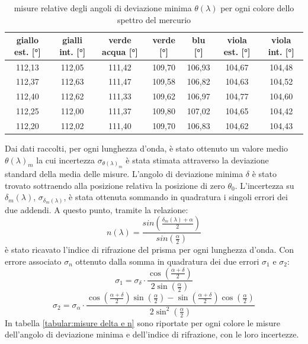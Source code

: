 \documentclass{article}
\begin{document}
        \begin{table}[H]

            \centering
            \begin{tabular}{c c c c c c c}

                \toprule 
                giallo est. [°] & gialli int. [°]& verde acqua [°]& verde [°]& blu [°]& viola est. [°]& viola int. [°]  \\
                
                \midrule
                112,13	&	112,05	&	111,42	&	109,70	&	106,93	&	104,67	&	104,48\\
                112,37	&	112,63	&	111,47	&	109,58	&	106,82	&	104,63	&	104,52\\
                112,40	&	112,62	&	111,33	&	109,62	&	106,97	&	104,77	&	104,60\\
                112,25	&	112,00	&	111,37	&	109,80	&	107,02	&	104,65	&	104,42\\
                112,20	&	112,02	&	111,40	&	109,70	&	106,83	&	104,62	&	104,43\\
                \bottomrule

            \end{tabular}

            \caption{misure relative degli angoli di deviazione minima $\theta(\lambda)$ per ogni colore dello spettro del mercurio}
            \label{tabular:theta misure}

        \end{table}

        Dai dati raccolti, per ogni lunghezza d'onda, è stato ottenuto un valore medio $\theta(\lambda)_m$ la cui incertezza $\sigma_{\theta(\lambda)_m}$ 
        è stata stimata attraverso la deviazione standard della media delle misure. L'angolo di deviazione minima $\delta$ è stato trovato sottraendo 
        alla posizione relativa la posizione di zero $\theta_0$. L'incertezza su $\delta_m(\lambda)$, $\sigma_{\delta_m(\lambda)}$, è stata ottenuta sommando 
        in quadratura i singoli errori dei due addendi. A questo punto, tramite la relazione:
        \[n(\lambda) = \frac{sin(\frac{\delta_m(\lambda) + \alpha}{2})}{sin(\frac{\alpha}{2})}\]
        è stato ricavato l'indice di rifrazione del prisma per ogni lunghezza d'onda. 
        Con errore associato $\sigma_n$ ottenuto dalla somma in quadratura dei due errori $\sigma_1$ e $\sigma_2$:
        \[\sigma_1 = \sigma_{\delta} \cdot \frac{\cos(\frac{\alpha + \delta}{2})}{2\sin(\frac{\alpha}{2})} \]
        \[\sigma_2 = \sigma_{\alpha}\cdot \frac{\cos(\frac{\alpha + \delta}{2})\sin(\frac{\alpha}{2}) - 
                    \sin(\frac{\alpha + \delta}{2})\cos(\frac{\alpha}{2})}{2\sin^2(\frac{\alpha}{2})} \]
        In tabella \ref{tabular:misure delta e n} sono riportate per ogni colore le misure dell'angolo di deviazione minima e dell'indice di rifrazione, con le loro incertezze.    
\end{document}
